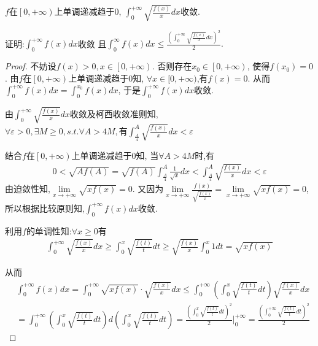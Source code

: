 \documentclass[lang=cn,newtx,10pt,scheme=chinese]{../Template/elegantbook}
\begin{document}
\begin{example}
$f$在$\left[ 0,+\infty \right) $上单调递减趋于0,
$\int_0^{+\infty}{\sqrt{\frac{f(x)}{x}}dx}$收敛.

证明:$\int_0^{+\infty}{f\left( x \right) dx}$收敛
且$\int_0^{\infty}{f\left( x \right) dx}\leqslant \frac{\left( \int_0^{+\infty}{\sqrt{\frac{f\left( x \right)}{x}}dx} \right) ^2}{2}.$
\begin{proof}
不妨设$f(x)>0,x\in \left[ 0,+\infty \right)$.
否则存在$x_0\in \left[ 0,+\infty \right)$,
使得$f\left( x_0 \right) =0$.
由$f$在$\left[ 0,+\infty \right) $上单调递减趋于0知,
$ \forall x\in [0,+\infty)$,有$f(x)=0$.
从而$\int_0^{+\infty}{f\left( x \right) dx}=\int_0^{x_0}{f\left( x \right) dx}$,
于是$\int_0^{+\infty}{f\left( x \right) dx}$收敛.

由$\int_0^{+\infty}{\sqrt{\frac{f(x)}{x}}dx}$收敛及柯西收敛准则知,
$\forall \varepsilon>0,\exists M\geqslant 0,s.t. \forall A>4M,\text{有}
\int_{\frac{A}{4}}^A{\sqrt{\frac{f(x)}{x}}dx}<\varepsilon$

结合$f$在$\left[ 0,+\infty \right) $上单调递减趋于0知,
当$\forall A>4M$时,有
\begin{equation}
\begin{split}
0<\sqrt{Af(A)}=\sqrt{f(A)}\int_{\frac{A}{4}}^A{\frac{1}{\sqrt{x}}dx<}\int_{\frac{A}{4}}^A{\sqrt{\frac{f(x)}{x}}dx<}\varepsilon 
\end{split}
\nonumber
\end{equation}
由迫敛性知,$\underset{x\rightarrow +\infty}{\lim}\sqrt{xf(x)}=0$.
又因为$\underset{x\rightarrow +\infty}{\lim}\frac{f(x)}{\sqrt{\frac{f(x)}{x}}}=\underset{x\rightarrow +\infty}{\lim}\sqrt{xf(x)}=0$,
所以根据比较原则知,$\int_0^{+\infty}{f\left( x \right) dx}$收敛.

利用$f$的单调性知:$\forall x \geqslant 0$有
\begin{equation}
\begin{split}
\int_0^{+\infty}{\sqrt{\frac{f(x)}{x}}dx}\geqslant \int_0^x{\sqrt{\frac{f(t)}{t}}dt}\geqslant \sqrt{\frac{f(x)}{x}}\int_0^x{1dt}=\sqrt{xf\left( x \right)}
\end{split}
\nonumber
\end{equation}

从而
\begin{equation}
\begin{split}
&\int_0^{+\infty}{f\left( x \right) dx=}\int_0^{+\infty}{\sqrt{xf\left( x \right)}\cdot \sqrt{\frac{f\left( x \right)}{x}}dx}\leqslant \int_0^{+\infty}{\left( \int_0^x{\sqrt{\frac{f\left( t \right)}{t}}dt} \right) \sqrt{\frac{f\left( x \right)}{x}}dx}
\\
&=\int_0^{+\infty}{\left( \int_0^x{\sqrt{\frac{f\left( t \right)}{t}}dt} \right) d\left( \int_0^x{\sqrt{\frac{f\left( t \right)}{t}}dt} \right)}=\frac{\left( \int_0^x{\sqrt{\frac{f\left( t \right)}{t}}dt} \right) ^2}{2}\Bigg|_{0}^{+\infty}=\frac{\left( \int_0^{+\infty}{\sqrt{\frac{f\left( t \right)}{t}}dt} \right) ^2}{2}
\end{split}
\nonumber
\end{equation}
\end{proof}
\end{example}
\end{document}
